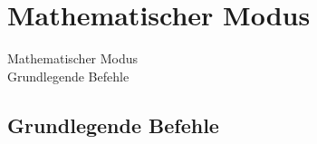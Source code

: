 \documentclass{beamer}
\begin{document}
 \section{Mathematischer Modus}
 \begin{frame}
  \begin{center}
   \Huge Mathematischer Modus \\
   \Large Grundlegende Befehle
  \end{center}
 \end{frame}
 
 \subsection{Grundlegende Befehle}
 
\end{document}
